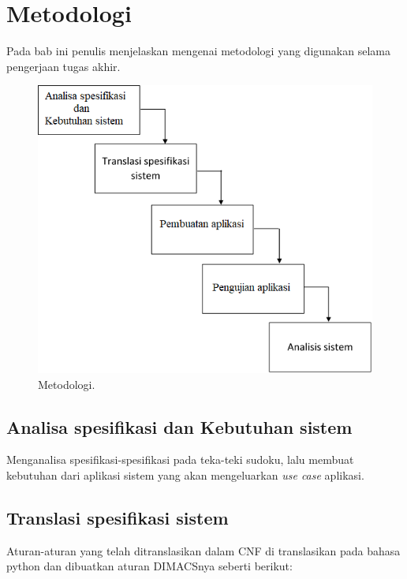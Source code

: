 \chapter{Metodologi}

Pada bab ini penulis menjelaskan mengenai metodologi yang digunakan selama pengerjaan tugas akhir.

\begin{figure}[H]
	\begin{centering}
		\includegraphics[scale=0.7]{metodologi_proposal}
		
		\caption{Metodologi.}
	\end{centering}
\end{figure}

\section{Analisa spesifikasi dan Kebutuhan sistem}

Menganalisa spesifikasi-spesifikasi pada teka-teki sudoku, lalu membuat kebutuhan dari aplikasi sistem yang akan mengeluarkan \textit{use case} aplikasi.

\section{Translasi spesifikasi sistem}

Aturan-aturan yang telah ditranslasikan dalam CNF di translasikan pada bahasa python dan dibuatkan aturan DIMACSnya seberti berikut:

